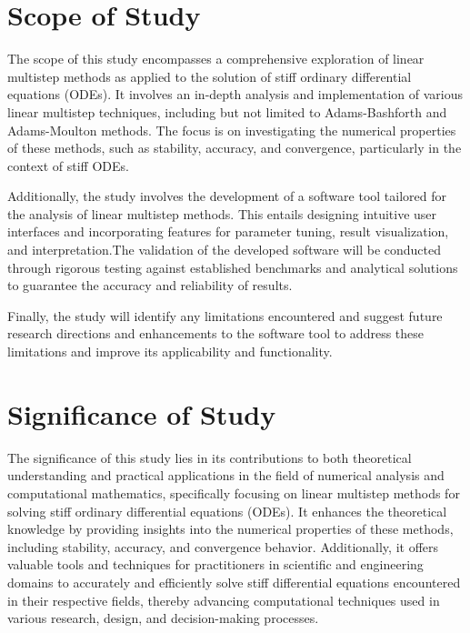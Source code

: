 \section{Scope of Study}
The scope of this study encompasses a comprehensive exploration of linear multistep methods as applied to the solution of stiff ordinary differential equations (ODEs). It involves an in-depth analysis and implementation of various linear multistep techniques, including but not limited to Adams-Bashforth and Adams-Moulton methods. The focus is on investigating the numerical properties of these methods, such as stability, accuracy, and convergence, particularly in the context of stiff ODEs.

Additionally, the study involves the development of a software tool tailored for the analysis of linear multistep methods. This entails designing intuitive user interfaces and incorporating features for parameter tuning, result visualization, and interpretation.The validation of the developed software will be conducted through rigorous testing against established benchmarks and analytical solutions to guarantee the accuracy and reliability of results.

Finally, the study will identify any limitations encountered and suggest future research directions and enhancements to the software tool to address these limitations and improve its applicability and functionality.

\section{Significance of Study}
The significance of this study lies in its contributions to both theoretical understanding and practical applications in the field of numerical analysis and computational mathematics, specifically focusing on linear multistep methods for solving stiff ordinary differential equations (ODEs). It enhances the theoretical knowledge by providing insights into the numerical properties of these methods, including stability, accuracy, and convergence behavior. Additionally, it offers valuable tools and techniques for practitioners in scientific and engineering domains to accurately and efficiently solve stiff differential equations encountered in their respective fields, thereby advancing computational techniques used in various research, design, and decision-making processes.



